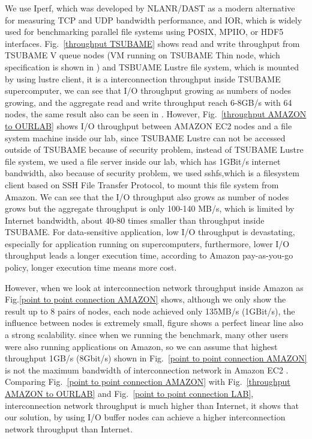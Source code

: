 We use Iperf\cite{iperf}, which was developed by NLANR/DAST as a modern alternative for measuring TCP and UDP bandwidth performance, and IOR\cite{IOR}, which is widely used for benchmarking parallel file systems using POSIX, MPIIO, or HDF5 interfaces.
Fig.~\ref{throughput TSUBAME} shows read and write throughput from TSUBAME V queue nodes (VM running on TSUBAME Thin node, which specification is shown in ) and TSBUAME Lustre file system, which is mounted by using lustre client, it is a interconnection throughput inside TSUBAME supercomputer, we can see that I/O throughput growing as numbers of nodes growing, and the aggregate read and write throughput reach 6-8GB/s with 64 nodes, the same result also can be seen in \cite{checkpointing}.
However, Fig.~\ref{throughput AMAZON to OURLAB} shows I/O throughput between AMAZON EC2 nodes and a file system machine inside our lab, since TSUBAME Lustre can not be accessed outside of TSUBAME because of security problem, instead of TSUBAME Lustre file system, we used a file server inside our lab, which has 1GBit/s internet bandwidth, also because of security problem, we used sshfs\cite{sshfs},which is a filesystem client based on SSH File Transfer Protocol, to mount this file system from Amazon.
We can see that the I/O throughput also grows as number of nodes grows but the aggregate throughput is only 100-140 MB/s, which is limited by Internet bandwidth, about 40-80 times smaller than throughput inside TSUBAME.
For data-sensitive application, low I/O throughput is devastating, especially for application running on supercomputers, furthermore, lower I/O throughput leads a longer execution time, according to Amazon pay-as-you-go policy, longer execution time means more cost.

However, when we look at interconnection network throughput inside Amazon as Fig.\ref{point to point connection AMAZON} shows, although we only show the result up to 8 pairs of nodes, each node achieved only 135MB/s (1GBit/s), the influence between nodes is extremely small, figure shows a perfect linear line also a strong scalability.
since when we running the benchmark, many other users were also running applications on Amazon, so we can assume that highest throughput 1GB/s (8Gbit/s) shown in Fig.~\ref{point to point connection AMAZON} is not the maximum bandwidth of interconnection network in Amazon EC2 .
Comparing Fig.~\ref{point to point connection AMAZON} with Fig.~\ref{throughput AMAZON to OURLAB} and Fig.~\ref{point to point connection LAB}, interconnection network throughput is much higher than Internet, it shows that our solution, by using I/O buffer nodes can achieve a higher interconnection network throughput than Internet.

